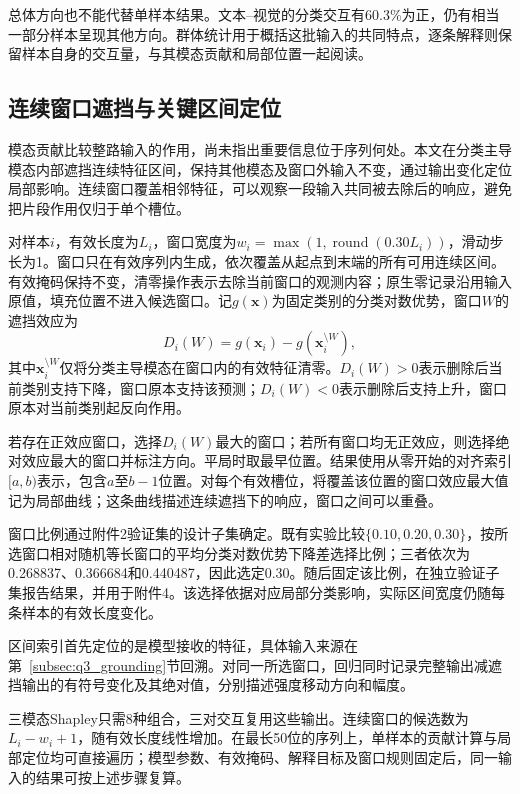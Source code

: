 \QThreeParagraph 总体方向也不能代替单样本结果。文本--视觉的分类交互有60.3\%为正，仍有相当一部分样本呈现其他方向。群体统计用于概括这批输入的共同特点，逐条解释则保留样本自身的交互量，与其模态贡献和局部位置一起阅读。

\subsection{连续窗口遮挡与关键区间定位}\label{subsec:q3_temporal}
\QThreeParagraph 模态贡献比较整路输入的作用，尚未指出重要信息位于序列何处。本文在分类主导模态内部遮挡连续特征区间，保持其他模态及窗口外输入不变，通过输出变化定位局部影响\cite{fong2017meaningful,petsiuk2018rise}。连续窗口覆盖相邻特征，可以观察一段输入共同被去除后的响应，避免把片段作用仅归于单个槽位。

\QThreeParagraph 对样本$i$，有效长度为$L_i$，窗口宽度为$w_i=\max(1,\operatorname{round}(0.30L_i))$，滑动步长为1。窗口只在有效序列内生成，依次覆盖从起点到末端的所有可用连续区间。有效掩码保持不变，清零操作表示去除当前窗口的观测内容；原生零记录沿用输入原值，填充位置不进入候选窗口。记$g(\mathbf x)$为固定类别的分类对数优势，窗口$W$的遮挡效应为
\begin{equation}
D_i(W)=g(\mathbf x_i)-g\!\left(\mathbf x_i^{\setminus W}\right),
\label{eq:q3_occlusion}
\end{equation}
\QThreeParagraph 其中$\mathbf x_i^{\setminus W}$仅将分类主导模态在窗口内的有效特征清零。$D_i(W)>0$表示删除后当前类别支持下降，窗口原本支持该预测；$D_i(W)<0$表示删除后支持上升，窗口原本对当前类别起反向作用。

\QThreeParagraph 若存在正效应窗口，选择$D_i(W)$最大的窗口；若所有窗口均无正效应，则选择绝对效应最大的窗口并标注方向。平局时取最早位置。结果使用从零开始的对齐索引$[a,b)$表示，包含$a$至$b-1$位置。对每个有效槽位，将覆盖该位置的窗口效应最大值记为局部曲线；这条曲线描述连续遮挡下的响应，窗口之间可以重叠。

\QThreeParagraph 窗口比例通过附件2验证集的设计子集确定。既有实验比较$\{0.10,0.20,0.30\}$，按所选窗口相对随机等长窗口的平均分类对数优势下降差选择比例；三者依次为0.268837、0.366684和0.440487，因此选定0.30。随后固定该比例，在独立验证子集报告结果，并用于附件4。该选择依据对应局部分类影响，实际区间宽度仍随每条样本的有效长度变化。

\QThreeParagraph 区间索引首先定位的是模型接收的特征，具体输入来源在第~\ref{subsec:q3_grounding}节回溯。对同一所选窗口，回归同时记录完整输出减遮挡输出的有符号变化及其绝对值，分别描述强度移动方向和幅度。

\QThreeParagraph 三模态Shapley只需8种组合，三对交互复用这些输出。连续窗口的候选数为$L_i-w_i+1$，随有效长度线性增加。在最长50位的序列上，单样本的贡献计算与局部定位均可直接遍历；模型参数、有效掩码、解释目标及窗口规则固定后，同一输入的结果可按上述步骤复算。

